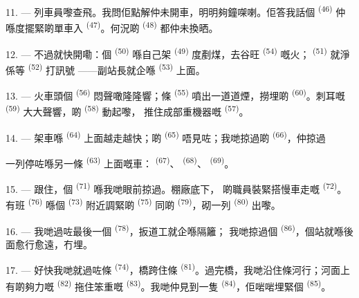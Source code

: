 11. --- 列車員嚟查飛。我問佢點解仲未開車，明明夠鐘㗎喇。佢答我話個
 \textsuperscript{(46)} 仲喺度擺緊啲單車入
\textsuperscript{(47)}。何況啲 \textsuperscript{(48)} 都仲未換晒。

12. --- 不過就快開嘞：個 \textsuperscript{(50)} 喺自己架
\textsuperscript{(49)} 度剷煤，去谷旺 \textsuperscript{(54)} 嘅火；
 \textsuperscript{(51)} 就淨係等 \textsuperscript{(52)} 打訊號
——副站長就企喺 \textsuperscript{(53)} 上面。

13. --- 火車頭個 \textsuperscript{(56)} 悶聲噉隆隆響；條
\textsuperscript{(55)} 噴出一道道煙，撈埋啲 \textsuperscript{(60)}。刺耳嘅
 \textsuperscript{(59)} 大大聲響，啲 \textsuperscript{(58)} 動起嚟，
推住成部重機器嘅 \textsuperscript{(57)}。

\VUsaut{3.0mm}
\VUsaut{3.0mm}

14. --- 架車喺 \textsuperscript{(64)} 上面越走越快；啲
\textsuperscript{(65)} 唔見咗；我哋掠過啲 \textsuperscript{(66)}，仲掠過


一列停咗喺另一條 \textsuperscript{(63)} 上面嘅車：
\textsuperscript{(67)}、 \textsuperscript{(68)}、
\textsuperscript{(69)}。

15. --- 跟住，個 \textsuperscript{(71)} 喺我哋眼前掠過。棚廠底下，
啲職員裝緊搭慢車走嘅 \textsuperscript{(72)}。有班
\textsuperscript{(76)} 喺個 \textsuperscript{(73)} 附近調緊啲
\textsuperscript{(75)} 同啲 \textsuperscript{(79)}，砌一列
\textsuperscript{(80)} 出嚟。

16. --- 我哋過咗最後一個 \textsuperscript{(78)}，扳道工就企喺隔籬；
我哋掠過個 \textsuperscript{(86)}，個站就喺後面愈行愈遠，冇埋。

17. --- 好快我哋就過咗條 \textsuperscript{(74)}，橋跨住條
\textsuperscript{(81)}。過完橋，我哋沿住條河行；河面上有啲夠力嘅
\textsuperscript{(82)} 拖住笨重嘅 \textsuperscript{(83)}。我哋仲見到一隻
 \textsuperscript{(84)}，佢啱啱埋緊個 \textsuperscript{(85)}。

